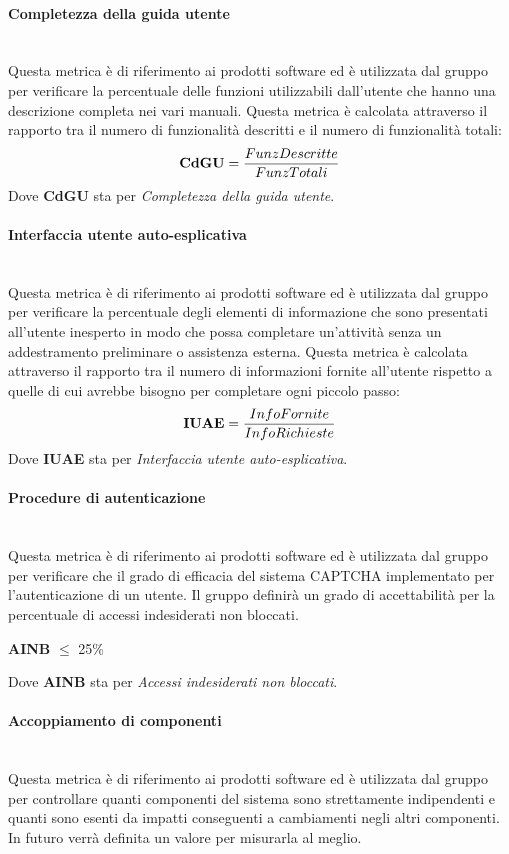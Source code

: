\paragraph{Completezza della guida utente}\mbox{}\\
Questa metrica è di riferimento ai prodotti software ed è utilizzata dal gruppo per verificare la percentuale delle funzioni utilizzabili dall'utente che hanno una descrizione completa nei vari manuali. Questa metrica è calcolata attraverso il rapporto tra il numero di funzionalità descritti e il numero di funzionalità totali:
\begin{align*}
	\centering
	\textbf{CdGU} = \frac{FunzDescritte}{FunzTotali}
\end{align*}
Dove \textbf{CdGU} sta per \textit{Completezza della guida utente}.
\paragraph{Interfaccia utente auto-esplicativa}\mbox{}\\
Questa metrica è di riferimento ai prodotti software ed è utilizzata dal gruppo per verificare la percentuale degli elementi di informazione che sono presentati all’utente inesperto in modo che possa completare un’attività senza un addestramento preliminare o assistenza esterna. Questa metrica è calcolata attraverso il rapporto tra il numero di informazioni fornite all'utente rispetto a quelle di cui avrebbe bisogno per completare ogni piccolo passo:
\begin{align*}
	\centering
	\textbf{IUAE} = \frac{InfoFornite}{InfoRichieste}
\end{align*}
Dove \textbf{IUAE} sta per \textit{Interfaccia utente auto-esplicativa}.
\paragraph{Procedure di autenticazione}\mbox{}\\
Questa metrica è di riferimento ai prodotti software ed è utilizzata dal gruppo per verificare che il grado di efficacia del sistema CAPTCHA implementato per l'autenticazione di un utente. Il gruppo definirà un grado di accettabilità per la percentuale di accessi indesiderati non bloccati.
\begin{center}
	\textbf{AINB} $\le$ 25\%
\end{center}
Dove \textbf{AINB} sta per \textit{Accessi indesiderati non bloccati}.
\paragraph{Accoppiamento di componenti}\mbox{}\\
Questa metrica è di riferimento ai prodotti software ed è utilizzata dal gruppo per controllare quanti componenti del sistema sono strettamente  indipendenti e quanti sono esenti da impatti conseguenti a cambiamenti negli altri componenti.
In futuro verrà definita un valore per misurarla al meglio. 
\newpage
